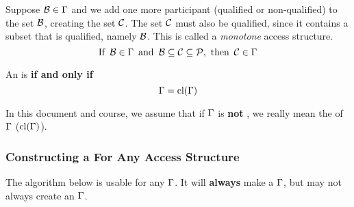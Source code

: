 \begin{definition}[Monotone]\label{def:Monotone_Access_Structure}
  Suppose $\operatorname{\mathcal{B}} \in \operatorname{\Gamma}$ and we add one more participant (qualified or non-qualified) to the set $\operatorname{\mathcal{B}}$, creating the set $\operatorname{\mathcal{C}}$.
  The set $\operatorname{\mathcal{C}}$ must also be qualified, since it contains a subset that is qualified, namely $\operatorname{\mathcal{B}}$.
  This  is called a \emph{monotone} access structure.
  \begin{equation}\label{eq:Monotone_Access_Structure}
    \text{If } \operatorname{\mathcal{B}} \in \operatorname{\Gamma} \text{ and } \operatorname{\mathcal{B}} \subseteq \operatorname{\mathcal{C}} \subseteq \operatorname{\mathcal{P}}, \text{ then } \operatorname{\mathcal{C}} \in \operatorname{\Gamma}
  \end{equation}

  \begin{remark}\label{rmk:Monotone_Closure_Access_Structure}
    An  is  \textbf{if and only if}
    \begin{equation}\label{eq:Monotone_Closure_Access_Structure}
      \operatorname{\Gamma} = \operatorname{\text{cl}}(\operatorname{\Gamma})
    \end{equation}
  \end{remark}

  \begin{remark}
    In this document and course, we assume that if $\operatorname{\Gamma}$ is \textbf{not} , we really mean the  of $\operatorname{\Gamma}$ ($\operatorname{\text{cl}}(\operatorname{\Gamma})$).
  \end{remark}
\end{definition}

\subsubsection{Constructing a  For Any Access Structure}\label{subsubsec:Construct_Perfect_Secret_Sharing_Scheme}
The algorithm below is usable for any $\operatorname{\Gamma}$.
It will \textbf{always} make a  $\operatorname{\Gamma}$, but may not always create an  $\operatorname{\Gamma}$.

